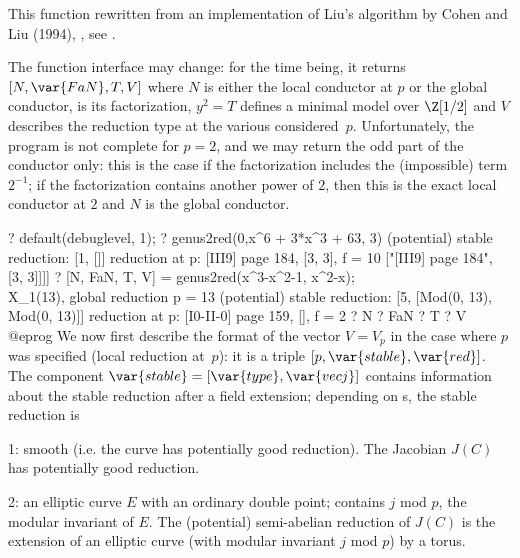 \noindent This function rewritten from an implementation of Liu's algorithm by
Cohen and Liu (1994), , see
.

 The function interface may change: for the
time being, it returns $[N,\var{FaN}, T, V]$
where $N$ is either the local conductor at $p$ or the
global conductor,  is its factorization, $y^2 = T$ defines a
minimal model over $\Z[1/2]$ and $V$ describes the reduction type at the
various considered~$p$. Unfortunately, the program is not complete for
$p = 2$, and we may return the odd part of the conductor only: this is the
case if the factorization includes the (impossible) term $2^{-1}$; if the
factorization contains another power of $2$, then this is the exact local
conductor at $2$ and $N$ is the global conductor.

\bprog
? default(debuglevel, 1);
? genus2red(0,x^6 + 3*x^3 + 63, 3)
(potential) stable reduction: [1, []]
reduction at p: [III{9}] page 184, [3, 3], f = 10
       ["[III{9}] page 184", [3, 3]]]]
? [N, FaN, T, V] = genus2red(x^3-x^2-1, x^2-x);  \\ X_1(13), global reduction
p = 13
(potential) stable reduction: [5, [Mod(0, 13), Mod(0, 13)]]
reduction at p: [I{0}-II-0] page 159, [], f = 2
? N
? FaN
? T
? V
@eprog\noindent
We now first describe the format of the vector $V = V_p$ in the case where
$p$ was specified (local reduction at~$p$): it is a triple $[p, \var{stable},
\var{red}]$. The component $\var{stable} = [\var{type}, \var{vecj}]$ contains
information about the stable reduction after a field extension;
depending on s, the stable reduction is

\item 1: smooth (i.e. the curve has potentially good reduction). The
      Jacobian $J(C)$ has potentially good reduction.

\item 2: an elliptic curve $E$ with an ordinary double point; 
contains $j$ mod $p$, the modular invariant of $E$. The (potential)
semi-abelian reduction of $J(C)$ is the extension of an elliptic curve (with
modular invariant $j$ mod $p$) by a torus.

